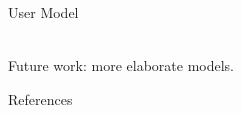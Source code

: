 \documentclass[aspectratio=1610]{beamer}
\begin{document}
\begin{frame}{User Model}
    \begin{center}
        \\
        \vspace{.1\textheight}%
        Future work: more elaborate models.
    \end{center}
\end{frame}

\begin{frame}[allowframebreaks, t]{References}
    \nocite{*}
    \printbibliography%
\end{frame}
\end{document}
